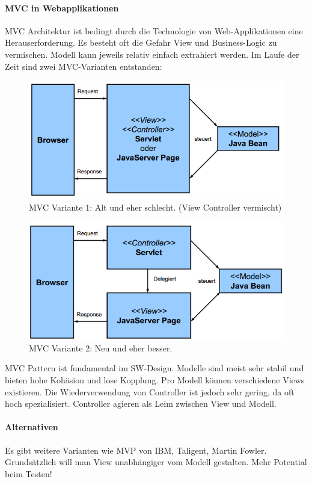 \paragraph{MVC in Webapplikationen} MVC Architektur ist bedingt durch die Technologie von Web-Applikationen eine Herauserforderung. Es besteht oft die Gefahr View und Business-Logic zu vermischen. Modell kann jeweils relativ einfach extrahiert werden. Im Laufe der Zeit sind zwei MVC-Varianten entstanden:

\begin{figure}[h!]
\centering
\includegraphics[width=0.7\linewidth]{fig/mvc-web-1}
\caption{MVC Variante 1: Alt und eher schlecht. (View Controller vermischt)}
\label{fig:mvc-web-1}
\end{figure}

\begin{figure}[h!]
\centering
\includegraphics[width=0.7\linewidth]{fig/mvc-web-2}
\caption{MVC Variante 2: Neu und eher besser.}
\label{fig:mvc-web-2}
\end{figure}

MVC Pattern ist fundamental im SW-Design. Modelle sind meist sehr stabil und bieten hohe Kohäsion und lose Kopplung. Pro Modell können verschiedene Views existieren. Die Wiederverwendung von Controller ist jedoch sehr gering, da oft hoch spezialisiert. Controller agieren als Leim zwischen View und Modell.

\paragraph{Alternativen} Es gibt weitere Varianten wie MVP von IBM, Taligent, Martin Fowler. Grundsätzlich will man View unabhängiger vom Modell gestalten. Mehr Potential beim Testen!

